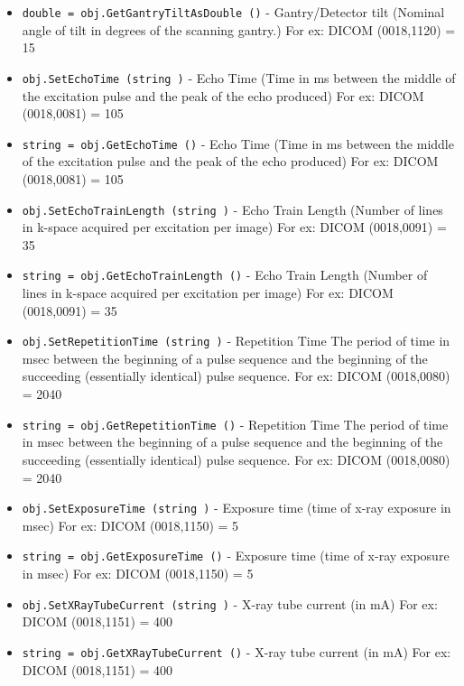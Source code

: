 \begin{itemize}
\item  \verb|double = obj.GetGantryTiltAsDouble ()| -  Gantry/Detector tilt (Nominal angle of tilt in degrees of the scanning
 gantry.)
 For ex: DICOM (0018,1120) = 15

\item  \verb|obj.SetEchoTime (string )| -  Echo Time
 (Time in ms between the middle of the excitation pulse and the peak of
 the echo produced)
 For ex: DICOM (0018,0081) = 105

\item  \verb|string = obj.GetEchoTime ()| -  Echo Time
 (Time in ms between the middle of the excitation pulse and the peak of
 the echo produced)
 For ex: DICOM (0018,0081) = 105

\item  \verb|obj.SetEchoTrainLength (string )| -  Echo Train Length
 (Number of lines in k-space acquired per excitation per image)
 For ex: DICOM (0018,0091) = 35

\item  \verb|string = obj.GetEchoTrainLength ()| -  Echo Train Length
 (Number of lines in k-space acquired per excitation per image)
 For ex: DICOM (0018,0091) = 35

\item  \verb|obj.SetRepetitionTime (string )| -  Repetition Time
 The period of time in msec between the beginning of a pulse sequence and
 the beginning of the succeeding (essentially identical) pulse sequence.
 For ex: DICOM (0018,0080) = 2040

\item  \verb|string = obj.GetRepetitionTime ()| -  Repetition Time
 The period of time in msec between the beginning of a pulse sequence and
 the beginning of the succeeding (essentially identical) pulse sequence.
 For ex: DICOM (0018,0080) = 2040

\item  \verb|obj.SetExposureTime (string )| -  Exposure time (time of x-ray exposure in msec)
 For ex: DICOM (0018,1150) = 5

\item  \verb|string = obj.GetExposureTime ()| -  Exposure time (time of x-ray exposure in msec)
 For ex: DICOM (0018,1150) = 5

\item  \verb|obj.SetXRayTubeCurrent (string )| -  X-ray tube current (in mA)
 For ex: DICOM (0018,1151) = 400

\item  \verb|string = obj.GetXRayTubeCurrent ()| -  X-ray tube current (in mA)
 For ex: DICOM (0018,1151) = 400


\end{itemize}
